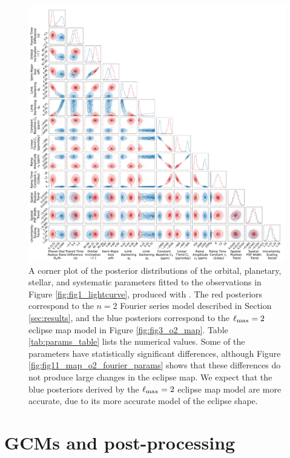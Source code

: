 \documentclass[twocolumn]{aastex631}
\begin{document}
\appendix 

\begin{figure}
    \centering
    \includegraphics[width=\textwidth]{fig10_corner.pdf}
    \caption{A corner plot of the posterior distributions of the orbital, planetary, stellar, and systematic parameters fitted to the observations in Figure \ref{fig:fig1_lightcurve}, produced with \citet{foreman2016corner}. The red posteriors correspond to the $n=2$ Fourier series model described in Section \ref{sec:results}, and the blue posteriors correspond to the $\ell_{\rm max}=2$ eclipse map model in Figure \ref{fig:fig3_o2_map}. Table \ref{tab:params_table} lists the numerical values. Some of the parameters have statistically significant differences, although Figure \ref{fig:fig11_map_o2_fourier_params} shows that these differences do not produce large changes in the eclipse map. We expect that the blue posteriors derived by the $\ell_{\rm max}=2$ eclipse map model are more accurate, due to its more accurate model of the eclipse shape.\vspace*{2cm}}
    \label{fig:fig10_corner}
\end{figure}


\section{GCMs and post-processing}\label{ap:gcms}
\end{document}

